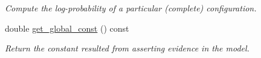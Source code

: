 \begin{DoxyCompactItemize}
\begin{DoxyCompactList}\small\item\em Compute the log-\/probability of a particular (complete) configuration. \end{DoxyCompactList}\item 
double \hyperlink{classmerlin_1_1graphical__model_afad10d82af1bf8a138e00a58f98ec18c}{get\+\_\+global\+\_\+const} () const \hypertarget{classmerlin_1_1graphical__model_afad10d82af1bf8a138e00a58f98ec18c}{}\label{classmerlin_1_1graphical__model_afad10d82af1bf8a138e00a58f98ec18c}

\begin{DoxyCompactList}\small\item\em Return the constant resulted from asserting evidence in the model. \end{DoxyCompactList}\end{DoxyCompactItemize}
